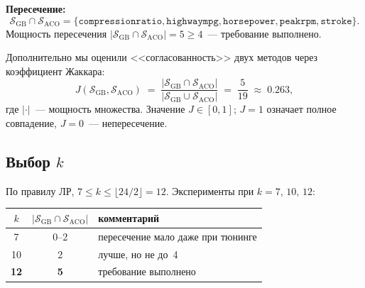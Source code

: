 \documentclass[12pt,a4paper]{article}
\begin{document}
\textbf{Пересечение:}
\[
  \mathcal{S}_{\text{GB}} \cap \mathcal{S}_{\text{ACO}}
    = \{\texttt{compressionratio}, \texttt{highwaympg}, \texttt{horsepower},
        \texttt{peakrpm}, \texttt{stroke}\}.
\]
Мощность пересечения
$|\mathcal{S}_{\text{GB}} \cap \mathcal{S}_{\text{ACO}}| = 5 \geq 4$~---
требование выполнено.

Дополнительно мы оценили <<согласованность>> двух методов через
коэффициент Жаккара:
\begin{equation}
  J(\mathcal{S}_{\text{GB}}, \mathcal{S}_{\text{ACO}}) \;=\;
    \frac{|\mathcal{S}_{\text{GB}} \cap \mathcal{S}_{\text{ACO}}|}
         {|\mathcal{S}_{\text{GB}} \cup \mathcal{S}_{\text{ACO}}|}
    \;=\; \frac{5}{19} \;\approx\; 0.263,
\end{equation}
где $|\cdot|$~--- мощность множества. Значение $J \in [0,1]$;
$J = 1$ означает полное совпадение, $J = 0$~--- непересечение.

\subsection{Выбор $k$}\label{sec:n}
По правилу ЛР, $7 \leq k \leq \lfloor 24/2 \rfloor = 12$.
Эксперименты при $k = 7,\,10,\,12$:

\begin{center}
\begin{tabular}{ccl}
\toprule
$k$ & $|\mathcal{S}_{\text{GB}} \cap \mathcal{S}_{\text{ACO}}|$ & комментарий \\
\midrule
7   & 0--2 & пересечение мало даже при тюнинге \\
10  & 2    & лучше, но не до~4 \\
\textbf{12} & \textbf{5} & требование выполнено \\
\bottomrule
\end{tabular}
\end{center}
\end{document}
